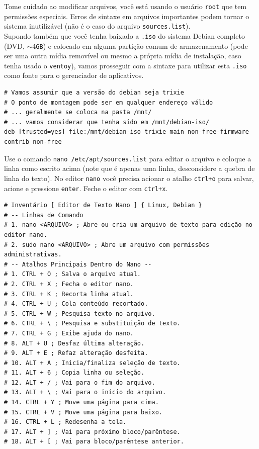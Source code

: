 \documentclass[12pt,a4paper]{article}
\begin{document}
Tome cuidado ao modificar arquivos, você está usando o usuário \texttt{root} que tem permissões especiais. Erros de sintaxe em arquivos importantes podem tornar o sistema inutilizável (não é o caso do arquivo \texttt{sources.list}). \\

Supondo também que você tenha baixado a \texttt{.iso} do sistema Debian completo (DVD, $\sim$4\texttt{GB}) e colocado em alguma partição comum de armazenamento (pode ser uma outra mídia removível ou mesmo a própria mídia de instalação, caso tenha usado o \texttt{ventoy}), vamos prosseguir com a sintaxe para utilizar esta \texttt{.iso} como fonte para o gerenciador de aplicativos. \\

\begin{lstlisting}
# Vamos assumir que a versão do debian seja trixie 
# O ponto de montagem pode ser em qualquer endereço válido
# ... geralmente se coloca na pasta /mnt/ 
# ... vamos considerar que tenha sido em /mnt/debian-iso/
deb [trusted=yes] file:/mnt/debian-iso trixie main non-free-firmware contrib non-free 
\end{lstlisting}

\vspace{\baselineskip}

Use o comando \texttt{nano /etc/apt/sources.list} para editar o arquivo e coloque a linha como escrito acima (note que é apenas uma linha, desconsidere a quebra de linha do texto). No editor \texttt{nano} você precisa acionar o atalho \texttt{ctrl+o} para salvar, acione e pressione \texttt{enter}. Feche o editor com \texttt{ctrl+x}.\\

\begin{lstlisting}
# Inventário [ Editor de Texto Nano ] { Linux, Debian }
# -- Linhas de Comando 
# 1. nano <ARQUIVO> ; Abre ou cria um arquivo de texto para edição no editor nano.
# 2. sudo nano <ARQUIVO> ; Abre um arquivo com permissões administrativas.
# -- Atalhos Principais Dentro do Nano --
# 1. CTRL + O ; Salva o arquivo atual.
# 2. CTRL + X ; Fecha o editor nano.
# 3. CTRL + K ; Recorta linha atual.
# 4. CTRL + U ; Cola conteúdo recortado.
# 5. CTRL + W ; Pesquisa texto no arquivo.
# 6. CTRL + \ ; Pesquisa e substituição de texto.
# 7. CTRL + G ; Exibe ajuda do nano.
# 8. ALT + U ; Desfaz última alteração.
# 9. ALT + E ; Refaz alteração desfeita.
# 10. ALT + A ; Inicia/finaliza seleção de texto.
# 11. ALT + 6 ; Copia linha ou seleção.
# 12. ALT + / ; Vai para o fim do arquivo.
# 13. ALT + \ ; Vai para o início do arquivo.
# 14. CTRL + Y ; Move uma página para cima.
# 15. CTRL + V ; Move uma página para baixo.
# 16. CTRL + L ; Redesenha a tela.
# 17. ALT + ] ; Vai para próximo bloco/parêntese.
# 18. ALT + [ ; Vai para bloco/parêntese anterior.
\end{lstlisting}
\end{document}
